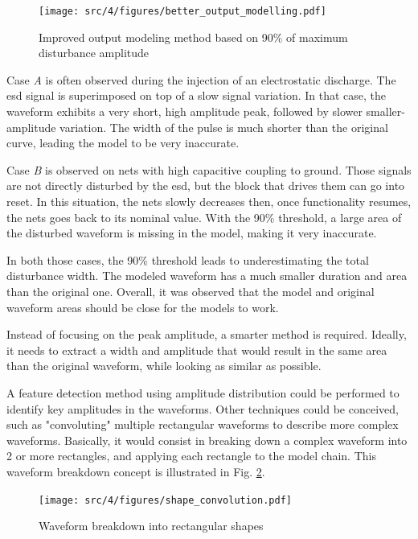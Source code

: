 \begin{figure}[!h]
  \centering
  \texttt{[image: src/4/figures/better\_output\_modelling.pdf]}
  \caption{Improved output modeling method based on 90\% of maximum disturbance amplitude}
  \label{fig:impact-single-failure-criteria}
\end{figure}

Case \textit{A} is often observed during the injection of an electrostatic discharge.
The \gls{esd} signal is superimposed on top of a slow signal variation.
In that case, the waveform exhibits a very short, high amplitude peak, followed by slower smaller-amplitude variation.
The width of the pulse is much shorter than the original curve, leading the model to be very inaccurate.

Case \textit{B} is observed on nets with high capacitive coupling to ground.
Those signals are not directly disturbed by the \gls{esd}, but the block that drives them can go into reset.
In this situation, the nets slowly decreases then, once functionality resumes, the nets goes back to its nominal value.
With the 90\% threshold, a large area of the disturbed waveform is missing in the model, making it very inaccurate.

In both those cases, the 90\% threshold leads to underestimating the total disturbance width.
The modeled waveform has a much smaller duration and area than the original one.
Overall, it was observed that the model and original waveform areas should be close for the models to work.

Instead of focusing on the peak amplitude, a smarter method is required.
Ideally, it needs to extract a width and amplitude that would result in the same area than the original waveform, while looking as similar as possible.

A feature detection method using amplitude distribution could be performed to identify key amplitudes in the waveforms.
Other techniques could be conceived, such as "convoluting" multiple rectangular waveforms to describe more complex waveforms.
Basically, it would consist in breaking down a complex waveform into 2 or more rectangles, and applying each rectangle to the model chain.
This waveform breakdown concept is illustrated in Fig. \ref{fig:waveform-deconvolution}.

\begin{figure}[!h]
  \centering
  \texttt{[image: src/4/figures/shape\_convolution.pdf]}
  \caption{Waveform breakdown into rectangular shapes}
  \label{fig:waveform-deconvolution}
\end{figure}

